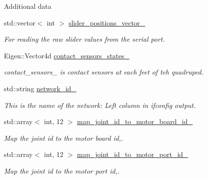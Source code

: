 \begin{DoxyCompactItemize}
\begin{DoxyCompactList}
 Additional data \end{DoxyCompactList}\item 
\mbox{\label{classblmc__robots_1_1Solo12_a0d9feba0ec7b4b34e463f85e778dc171}} 
std\+::vector$<$ int $>$ \hyperlink{classblmc__robots_1_1Solo12_a0d9feba0ec7b4b34e463f85e778dc171}{slider\+\_\+positions\+\_\+vector\+\_\+}
\begin{DoxyCompactList}\small\item\em For reading the raw slider values from the serial port. \end{DoxyCompactList}\item 
\mbox{\label{classblmc__robots_1_1Solo12_a04c43e0f8862e97e7902419edb7cd2a2}} 
Eigen\+::\+Vector4d \hyperlink{classblmc__robots_1_1Solo12_a04c43e0f8862e97e7902419edb7cd2a2}{contact\+\_\+sensors\+\_\+states\+\_\+}
\begin{DoxyCompactList}\small\item\em contact\+\_\+sensors\+\_\+ is contact sensors at each feet of teh quadruped. \end{DoxyCompactList}\item 
\mbox{\label{classblmc__robots_1_1Solo12_aa2fe5722e58645d80641238d1563b371}} 
std\+::string \hyperlink{classblmc__robots_1_1Solo12_aa2fe5722e58645d80641238d1563b371}{network\+\_\+id\+\_\+}
\begin{DoxyCompactList}\small\item\em This is the name of the network\+: Left column in ifconfig output. \end{DoxyCompactList}\item 
std\+::array$<$ int, 12 $>$ \hyperlink{classblmc__robots_1_1Solo12_a783154ba0e9e7a931bc25a2ae17cea37}{map\+\_\+joint\+\_\+id\+\_\+to\+\_\+motor\+\_\+board\+\_\+id\+\_\+}
\begin{DoxyCompactList}\small\item\em Map the joint id to the motor board id,. \end{DoxyCompactList}\item 
std\+::array$<$ int, 12 $>$ \hyperlink{classblmc__robots_1_1Solo12_adc6fc34d0685db1e9a6094474d1db903}{map\+\_\+joint\+\_\+id\+\_\+to\+\_\+motor\+\_\+port\+\_\+id\+\_\+}
\begin{DoxyCompactList}\small\item\em Map the joint id to the motor port id,. \end{DoxyCompactList}\item 

\end{DoxyCompactItemize}
